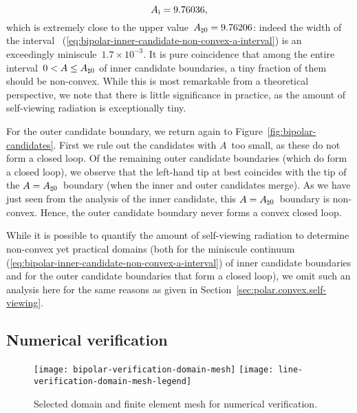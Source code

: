 \begin{equation}
  A_{\mathrm{i}} = 9.76036,
  \label{eq:bipolar-inner-candidate-a-inflection}
\end{equation}
which is extremely close to the upper value~$A_{\natural 0} = 9.76206$:
indeed the width of the interval~%
  (\ref{eq:bipolar-inner-candidate-non-convex-a-interval})
is an exceedingly miniscule~$1.7 \times 10^{-3}$.
It is pure coincidence that
among the entire interval~$0 < A \le A_{\natural 0}$
of inner candidate boundaries,
a tiny fraction of them should be non-convex.
While this is most remarkable from a theoretical perspective,
we note that there is little significance in practice,
as the amount of self-viewing radiation is exceptionally tiny.

For the outer candidate boundary,
we return again to Figure~\ref{fig:bipolar-candidates}.
First we rule out the candidates with $A$~too small,
as these do not form a closed loop.
Of the remaining outer candidate boundaries
(which do form a closed loop),
we observe that the left-hand tip at best
coincides with the tip of the $A = A_{\natural 0}$~boundary
(when the inner and outer candidates merge).
As we have just seen from the analysis of the inner candidate,
this $A = A_{\natural 0}$~boundary is non-convex.
Hence, the outer candidate boundary
never forms a convex closed loop.

While it is possible to quantify the amount of self-viewing radiation
to determine non-convex yet practical domains
(both for the miniscule continuum~%
  (\ref{eq:bipolar-inner-candidate-non-convex-a-interval})
of inner candidate boundaries
and for the outer candidate boundaries that form a closed loop),
we omit such an analysis here
for the same reasons as given in Section~\ref{sec:polar.convex.self-viewing}.

\subsection{Numerical verification}
\label{sec:bipolar.tracing.verification}

\begin{figure}
  \centering
  \texttt{[image: bipolar-verification-domain-mesh]}
  \texttt{[image: line-verification-domain-mesh-legend]}
  \caption{
    Selected domain and finite element mesh for numerical verification.
  }
  \label{fig:bipolar-verification-domain-mesh}
\end{figure}


